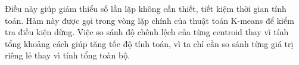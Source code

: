 Điều này giúp giảm thiểu số lần lặp không cần thiết, tiết kiệm thời gian tính toán. Hàm này được gọi trong vòng lặp chính của thuật toán K-means để kiểm tra điều kiện dừng. Việc so sánh độ chênh lệch của từng centroid thay vì tính tổng khoảng cách giúp tăng tốc độ tính toán, vì ta chỉ cần so sánh từng giá trị riêng lẻ thay vì tính tổng toàn bộ.